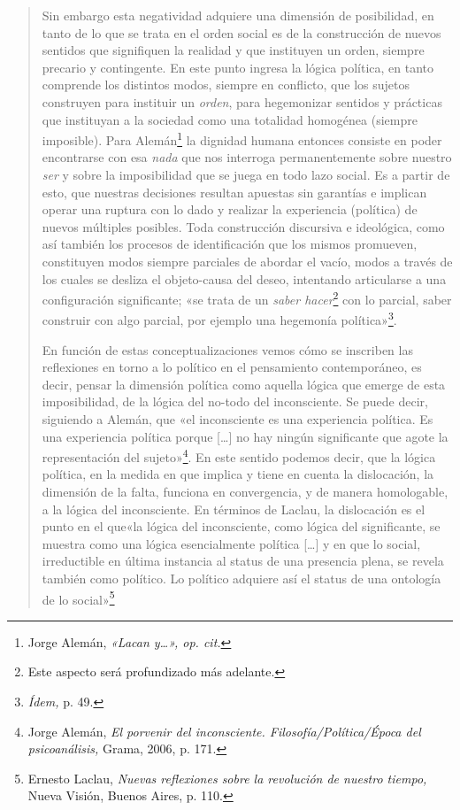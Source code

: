 \begin{quote}
Sin embargo esta negatividad adquiere una dimensión de posibilidad, en tanto de lo que se trata en el orden social es de la construcción de nuevos sentidos que signifiquen la realidad y que instituyen un orden, siempre precario y contingente. En este punto ingresa la lógica política, en tanto comprende los distintos modos, siempre en conflicto, que los sujetos construyen para instituir un \emph{orden}, para hegemonizar sentidos y prácticas que instituyan a la sociedad como una totalidad homogénea (siempre imposible). Para Alemán\footnote{Jorge Alemán, \emph{«Lacan y\ldots», op. cit.}} la dignidad humana entonces consiste en poder encontrarse con esa \emph{nada} que nos interroga permanentemente sobre nuestro \emph{ser} y sobre la imposibilidad que se juega en todo lazo social. Es a partir de esto, que nuestras decisiones resultan apuestas sin garantías e implican operar una ruptura con lo dado y realizar la experiencia (política) de nuevos múltiples posibles. Toda construcción discursiva e ideológica, como así también los procesos de identificación que los mismos promueven, constituyen modos siempre parciales de abordar el vacío, modos a través de los cuales se desliza el objeto-causa del deseo, intentando articularse a una configuración significante; «se trata de un \emph{saber hacer}\footnote{Este aspecto será profundizado más adelante.} con lo parcial, saber construir con algo parcial, por ejemplo una hegemonía política»\footnote{\emph{Ídem,} p. 49.}.

En función de estas conceptualizaciones vemos cómo se inscriben las reflexiones en torno a lo político en el pensamiento contemporáneo, es decir, pensar la dimensión política como aquella lógica que emerge de esta imposibilidad, de la lógica del no-todo del inconsciente. Se puede decir, siguiendo a Alemán, que «el inconsciente es una experiencia política. Es una experiencia política porque {[}\ldots{]} no hay ningún significante que agote la representación del sujeto»\footnote{Jorge Alemán, \emph{El porvenir del inconsciente. Filosofía/Política/Época del psicoanálisis,} Grama, 2006, p. 171.}. En este sentido podemos decir, que la lógica política, en la medida en que implica y tiene en cuenta la dislocación, la dimensión de la falta, funciona en convergencia, y de manera homologable, a la lógica del inconsciente. En términos de Laclau, la dislocación es el punto en el que«la lógica del inconsciente, como lógica del significante, se muestra como una lógica esencialmente política {[}\ldots{]} y en que lo social, irreductible en última instancia al status de una presencia plena, se revela también como político. Lo político adquiere así el status de una ontología de lo social»\footnote{Ernesto Laclau, \emph{Nuevas reflexiones sobre la revolución de nuestro tiempo,} Nueva Visión, Buenos Aires, p. 110.}
\end{quote}

